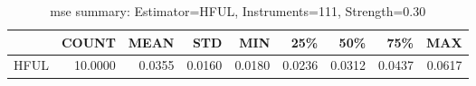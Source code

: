 \begin{table}[ht]
\centering
\caption{mse summary: Estimator=HFUL, Instruments=111, Strength=0.30}
\begin{tabular}{lrrrrrrrr}
\toprule
 & COUNT & MEAN & STD & MIN & 25\% & 50\% & 75\% & MAX \\
\midrule
HFUL & 10.0000 & 0.0355 & 0.0160 & 0.0180 & 0.0236 & 0.0312 & 0.0437 & 0.0617 \\
\bottomrule
\end{tabular}
\end{table}
